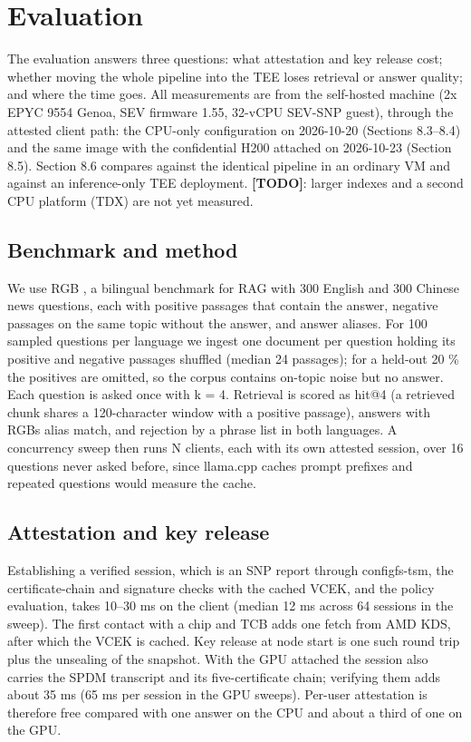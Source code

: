 \documentclass[letterpaper,twocolumn,10pt]{article}
\begin{document}
\section{Evaluation}\label{evaluation}

The evaluation answers three questions: what attestation and key release cost; whether moving the whole pipeline into the TEE loses retrieval or answer quality; and where the time goes. All measurements are from the self-hosted machine (2x EPYC 9554 Genoa, SEV firmware 1.55, 32-vCPU SEV-SNP guest), through the attested client path: the CPU-only configuration on 2026-10-20 (Sections 8.3--8.4) and the same image with the confidential H200 attached on 2026-10-23 (Section 8.5). Section 8.6 compares against the identical pipeline in an ordinary VM and against an inference-only TEE deployment. \textbf{{[}TODO{]}}: larger indexes and a second CPU platform (TDX) are not yet measured.

\subsection{Benchmark and method}\label{benchmark-and-method}

We use RGB \cite{chen2024rgb}, a bilingual benchmark for RAG with 300 English and 300 Chinese news questions, each with positive passages that contain the answer, negative passages on the same topic without the answer, and answer aliases. For 100 sampled questions per language we ingest one document per question holding its positive and negative passages shuffled (median 24 passages); for a held-out 20 \% the positives are omitted, so the corpus contains on-topic noise but no answer. Each question is asked once with k = 4. Retrieval is scored as hit@4 (a retrieved chunk shares a 120-character window with a positive passage), answers with RGB\textquotesingle s alias match, and rejection by a phrase list in both languages. A concurrency sweep then runs N clients, each with its own attested session, over 16 questions never asked before, since llama.cpp caches prompt prefixes and repeated questions would measure the cache.

\subsection{Attestation and key release}\label{attestation-and-key-release}

Establishing a verified session, which is an SNP report through configfs-tsm, the certificate-chain and signature checks with the cached VCEK, and the policy evaluation, takes 10--30 ms on the client (median 12 ms across 64 sessions in the sweep). The first contact with a chip and TCB adds one fetch from AMD KDS, after which the VCEK is cached. Key release at node start is one such round trip plus the unsealing of the snapshot. With the GPU attached the session also carries the SPDM transcript and its five-certificate chain; verifying them adds about 35 ms (65 ms per session in the GPU sweeps). Per-user attestation is therefore free compared with one answer on the CPU and about a third of one on the GPU.
\end{document}
